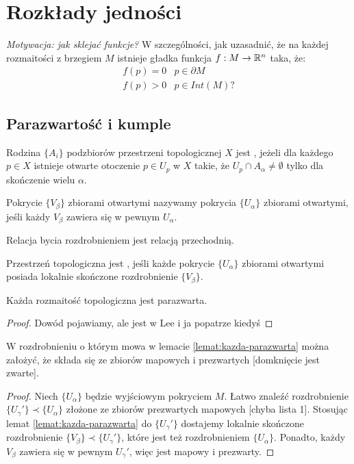 \section{Rozkłady jedności}
\emph{Motywacja: jak sklejać funkcje?} W szczególności, jak uzasadnić, że na każdej rozmaitości z brzegiem $M$ istnieje gładka funkcja $f:M\to\mathbb{R}^n$ taka, że:
$$
\begin{matrix}
f(p)=0 & p\in\partial M\\
f(p)>0 & p\in Int(M)?
\end{matrix}
$$

\subsection{Parazwartość i kumple}

\begin{definition}
Rodzina $\{A_i\}$ podzbiorów przestrzeni topologicznej $X$ jest , jeżeli dla każdego $p\in X$ istnieje otwarte otoczenie $p\in U_p$ w $X$ takie, że $U_p\cap A_\alpha\neq\emptyset$ tylko dla skończenie wielu $\alpha$.
\end{definition}

\begin{definition}[rozdrobnienie]
Pokrycie $\{V_\beta\}$ zbiorami otwartymi nazywamy  pokrycia $\{U_\alpha\}$ zbiorami otwartymi, jeśli każdy $V_\beta$ zawiera się w pewnym $U_\alpha$.
\end{definition}

Relacja bycia rozdrobnieniem jest relacją przechodnią.
\medskip

\begin{definition}[parazwartość]
Przestrzeń topologiczna jest , jeśli każde pokrycie $\{U_\alpha\}$ zbiorami otwartymi posiada lokalnie skończone rozdrobnienie $\{V_\beta\}$.
\end{definition}

\begin{lemma}\label{lemat:kazda-parazwarta}
Każda rozmaitość topologiczna jest parazwarta.
\end{lemma}
\begin{proof} Dowód pojawiamy, ale jest w Lee i ja popatrze kiedyś
\end{proof}

\begin{remark}
W rozdrobnieniu o którym mowa w lemacie \ref{lemat:kazda-parazwarta} można założyć, że składa się ze zbiorów mapowych i prezwartych [domknięcie jest zwarte].
\end{remark}
\begin{proof}
Niech $\{U_\alpha\}$ będzie wyjściowym pokryciem $M$. Łatwo znaleźć rozdrobnienie $\{U_\gamma'\}\prec\{U_\alpha\}$ złożone ze zbiorów prezwartych mapowych [chyba lista 1]. Stosując lemat \ref{lemat:kazda-parazwarta} do $\{U_\gamma'\}$ dostajemy lokalnie skończone rozdrobnienie $\{V_\beta\}\prec\{U_\gamma'\}$, które jest też rozdrobnieniem $\{U_\alpha\}$. Ponadto, każdy $V_\beta$ zawiera się w pewnym $U_\gamma'$, więc jest mapowy i prezwarty.
\end{proof}

